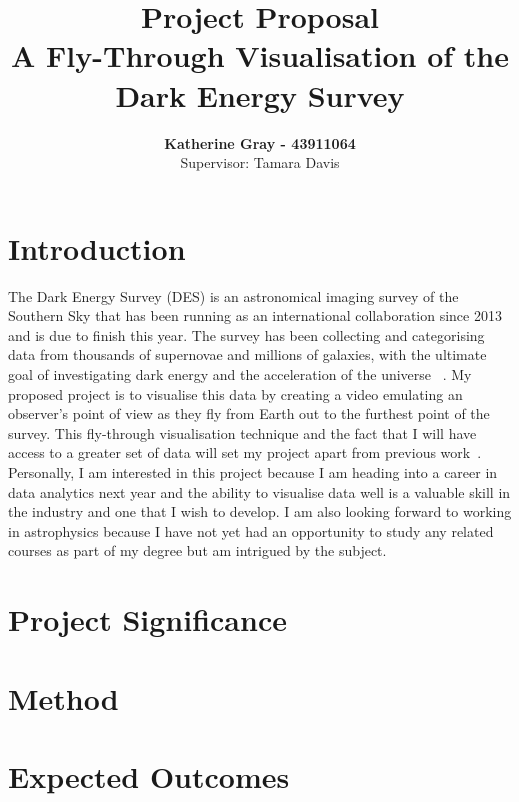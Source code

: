 \documentclass[pra, reprint, A4 paper, bibnotes]{revtex4-1}
\begin{document}
\title{Project Proposal\\A Fly-Through Visualisation of the Dark Energy Survey}
\author{\textbf{Katherine Gray - 43911064}\\ Supervisor: Tamara Davis}

\maketitle %
\thispagestyle{fancy} %
\pagebreak
\section{Introduction}
The Dark Energy Survey (DES) is an astronomical imaging survey of the Southern Sky that has been running as an international collaboration since 2013 and is due to finish this year. The survey has been collecting and categorising data from thousands of supernovae and millions of galaxies, with the ultimate goal of investigating dark energy and the acceleration of the universe ~\cite{dark_energy_survey_collaboration_dark_2016}. My proposed project is to visualise this data by creating a video emulating an observer's point of view as they fly from Earth out to the furthest point of the survey. This fly-through visualisation technique and the fact that I will have access to a greater set of data will set my project apart from previous work~\cite{samuel_hinton_+ozdes+sdss_2017, ralf_kaehler_year_2017}. Personally, I am interested in this project because I am heading into a career in data analytics next year and the ability to visualise data well is a valuable skill in the industry and one that I wish to develop. I am also looking forward to working in astrophysics because I have not yet had an opportunity to study any related courses as part of my degree but am intrigued by the subject. 

\section{Project Significance}


\section{Method}
\section{Expected Outcomes}


\end{document}
